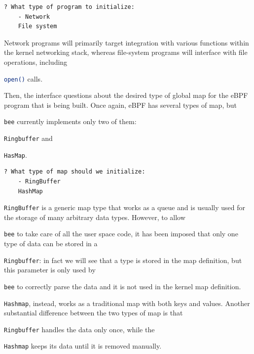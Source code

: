 \begin{lstlisting}[style=commandline, language=bash, caption={\colorbox{backcolour}{\lstinline[style=commandline, language=bash]|bee|} type of program selection.}]
	? What type of program to initialize: 
	- Network
	File system
\end{lstlisting}

Network programs will primarily target integration with various functions within the kernel networking stack, whereas file-system programs will interface with file operations, including \raggedright\colorbox{backcolour}{\lstinline[style=commandline, language=bash]|open()|} calls.

Then, the interface questions about the desired type of global map for the eBPF program that is being built.
Once again, eBPF has several types of map, but \raggedright\colorbox{backcolour}{\lstinline[style=commandline, language=bash]|bee|} currently implements only two of them: \raggedright\colorbox{backcolour}{\lstinline[style=commandline, language=bash]|Ringbuffer|} and \raggedright\colorbox{backcolour}{\lstinline[style=commandline, language=bash]|HasMap|}.

\begin{lstlisting}[style=commandline, language=bash, caption={\colorbox{backcolour}{\lstinline[style=commandline, language=bash]|bee|} map type selection.}]
	? What type of map should we initialize: 
	- RingBuffer
	HashMap
\end{lstlisting}

\raggedright\colorbox{backcolour}{\lstinline[style=commandline, language=bash]|RingBuffer|} is a generic map type that works as a queue and is usually used for the storage of many arbitrary data types.
However, to allow \raggedright\colorbox{backcolour}{\lstinline[style=commandline, language=bash]|bee|} to take care of all the user space code, it has been imposed that only one type of data can be stored in a \raggedright\colorbox{backcolour}{\lstinline[style=commandline, language=bash]|Ringbuffer|}: in fact we will see that a type is stored in the map definition, but this parameter is only used by \raggedright\colorbox{backcolour}{\lstinline[style=commandline, language=bash]|bee|} to correctly parse the data and it is not used in the kernel map definition. 
\raggedright\colorbox{backcolour}{\lstinline[style=commandline, language=bash]|Hashmap|}, instead, works as a traditional map with both keys and values.
Another substantial difference between the two types of map is that \raggedright\colorbox{backcolour}{\lstinline[style=commandline, language=bash]|Ringbuffer|} handles the data only once, while the \raggedright\colorbox{backcolour}{\lstinline[style=commandline, language=bash]|Hashmap|} keeps its data until it is removed manually.

